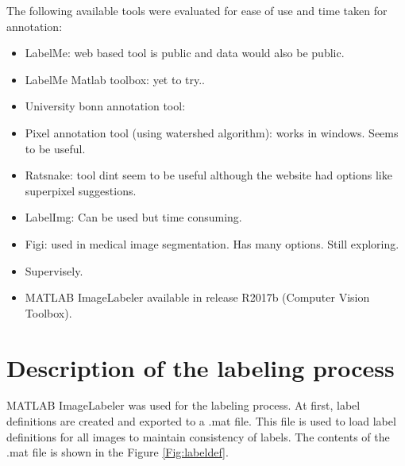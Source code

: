The following available tools were evaluated for ease of use and time taken for annotation:
	\begin{itemize}
		\item LabelMe: web based tool is public and data would also be public.
		\item LabelMe Matlab toolbox: yet to try..
		\item University bonn annotation tool:
		\item Pixel annotation tool (using watershed algorithm): works in windows. Seems to be useful.
		\item Ratsnake: tool dint seem to be useful although the website had options like superpixel suggestions.
		\item LabelImg: Can be used but time consuming.
		\item Figi: used in medical image segmentation. Has many options. Still exploring.
		\item Supervisely.
		\item MATLAB ImageLabeler available in release R2017b (Computer Vision Toolbox).
	\end{itemize}

\section{Description of the labeling process}
\label{section:process}
MATLAB ImageLabeler was used for the labeling process. At first, label definitions are created and exported to a .mat file. This file is used to load label definitions for all images to maintain consistency of labels. The contents of the .mat file is shown in the Figure \ref{Fig:labeldef}.
	
